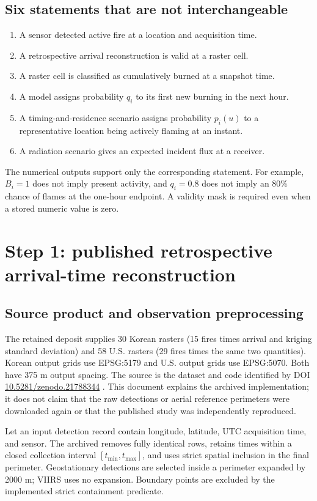 \documentclass[11pt,a4paper]{article}
\begin{document}
\subsection{Six statements that are not interchangeable}
\begin{enumerate}
\item A sensor detected active fire at a location and acquisition time.
\item A retrospective arrival reconstruction is valid at a raster cell.
\item A raster cell is classified as cumulatively burned at a snapshot time.
\item A model assigns probability $q_i$ to its first new burning in the next hour.
\item A timing-and-residence scenario assigns probability $p_i(u)$ to a
representative location being actively flaming at an instant.
\item A radiation scenario gives an expected incident flux at a receiver.
\end{enumerate}
The numerical outputs support only the corresponding statement. For example,
$B_i=1$ does not imply present activity, and $q_i=0.8$ does not imply an 80\%
chance of flames at the one-hour endpoint. A validity mask is required even
when a stored numeric value is zero.

\section{Step 1: published retrospective arrival-time reconstruction}
\label{sec:reconstruction}
\subsection{Source product and observation preprocessing}
The retained deposit supplies 30 Korean rasters (15 fires times arrival and
kriging standard deviation) and 58 U.S. rasters (29 fires times the same two
quantities). Korean output grids use EPSG:5179 and U.S. output grids use
EPSG:5070. Both have 375 m output spacing. The source is the dataset and code
identified by DOI \href{https://doi.org/10.5281/zenodo.21788344}{10.5281/zenodo.21788344}
\cite{toadeposit,codetoa}. This document explains the archived implementation;
it does not claim that the raw detections or aerial reference perimeters were
downloaded again or that the published study was independently reproduced.

Let an input detection record contain longitude, latitude, UTC acquisition time,
and sensor. The archived  removes fully identical rows,
retains times within a closed collection interval $[t_{\min},t_{\max}]$, and
uses strict spatial inclusion in the final perimeter. Geostationary detections
are selected inside a perimeter expanded by 2000 m; VIIRS uses no expansion.
Boundary points are excluded by the implemented strict containment predicate.
\end{document}
